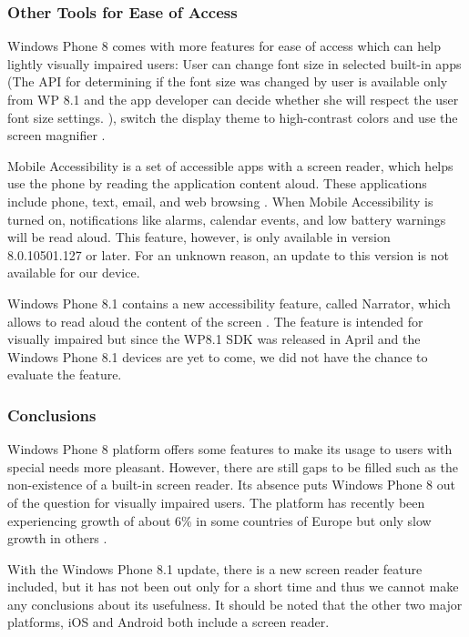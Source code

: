 \subsubsection{Other Tools for Ease of Access}
Windows Phone 8 comes with more features for ease of access which can help lightly visually impaired users: User can change font size in selected built-in apps (The API for determining if the font size was changed by user is available only from WP 8.1 and the app developer can decide whether she will respect the user font size settings. \cite{wp8accText}), switch the display theme to high-contrast colors and use the screen magnifier \cite{wp8screenreader}.

Mobile Accessibility is a set of accessible apps with a screen reader, which helps use the phone by reading the application content aloud. These applications include phone, text, email, and web browsing \cite{wp8screenreader}. When Mobile Accessibility is turned on, notifications like alarms, calendar events, and low battery warnings will be read aloud. This feature, however, is only available in version 8.0.10501.127 \cite{wp8screenreader} or later. For an unknown reason, an update to this version is not available for our device.

Windows Phone 8.1 contains a new accessibility feature, called Narrator, which allows to read aloud the content of the screen \cite{wp8narrator}. The feature is intended for visually impaired but since the WP8.1 SDK was released in April \cite{wp8.1rc} and the Windows Phone 8.1 devices are yet to come, we did not have the chance to evaluate the feature.

\subsubsection{Conclusions}
Windows Phone 8 platform offers some features to make its usage to users with special needs more pleasant. However, there are still gaps to be filled such as the non-existence of a built-in screen reader. Its absence puts Windows Phone 8 out of the question for visually impaired users. The platform has recently been experiencing growth of about 6\% in some countries of Europe but only slow growth in others \cite{phone8market}.

With the Windows Phone 8.1 update, there is a new screen reader feature included, but it has not been out only for a short time and thus we cannot make any conclusions about its usefulness. It should be noted that the other two major platforms, iOS and Android both include a screen reader.





